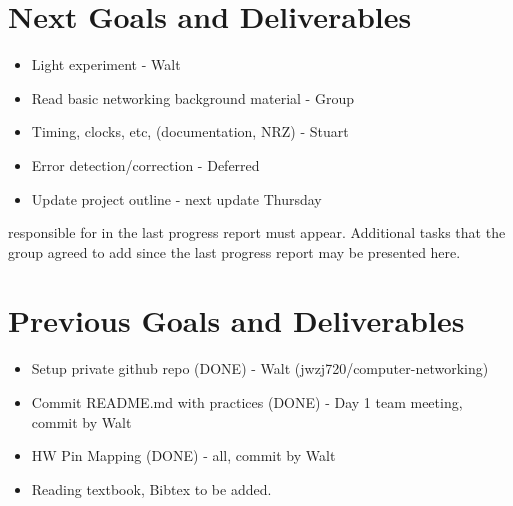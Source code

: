 \documentclass{article}
\begin{document}
\section*{Next Goals and Deliverables}
\begin{itemize}
\item Light experiment - Walt
\item Read basic networking background material - Group
\item Timing, clocks, etc, (documentation, NRZ) - Stuart
\item Error detection/correction - Deferred
\item Update project outline - next update Thursday
\end{itemize}
responsible for in the last progress report must appear. Additional tasks that the
group agreed to add since the last progress report may be presented here.
\section*{Previous Goals and Deliverables}
\begin{itemize}
\item Setup private github repo (DONE) - Walt (jwzj720/computer-networking)
\item Commit README.md with practices (DONE) - Day 1 team meeting, commit by Walt
\item HW Pin Mapping (DONE) - all, commit by Walt
\item Reading textbook, Bibtex to be added.
\end{itemize}
\end{document}
